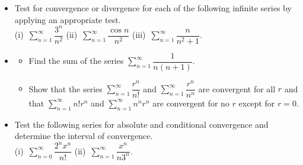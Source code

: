 \documentclass[12pt]{uz-exame}
\begin{document}
\begin{question}
\begin{itemize}
\item[(a)] Test for convergence or divergence for each of the following infinite series by applying an appropriate test.\\
(i)\, $\displaystyle \sum _{n=1}^\infty \dfrac{3^n}{n^2}$ \quad (ii)\, $\displaystyle \sum _{n=1}^\infty \dfrac{\cos n}{n^2}$ \quad (iii)\, $\displaystyle \sum _{n=1}^\infty \dfrac{n}{n^2+1}$. 
\item[(b)] \begin{itemize}
\item[(i)] Find the sum of the series $\displaystyle \sum _{n=1}^\infty\dfrac{1}{n(n+1)}$. 
\item[(ii)] Show that the series $\displaystyle \sum _{n=1}^\infty \dfrac{r^n}{n!}$ and $\displaystyle \sum _{n=1}^\infty \dfrac{r^n}{n^n}$ are convergent for all $r$ and that $\displaystyle \sum _{n=1}^\infty n!r^n$ and $\displaystyle \sum _{n=1}^\infty n^n r^n$ are convergent for no $r$ except for $r=0$. 
\end{itemize}
\item[(c)] Test the following series for absolute and conditional convergence and determine the interval of convergence.\\
(i)\,  $\displaystyle \sum _{n=0}^\infty \dfrac{2^nx^n}{n!}$ \quad (ii)\, $\displaystyle \sum _{n=1}^\infty \dfrac{x^n}{n3^n} $. 
\end{itemize}
\end{question}
\endexam
\end{document}
